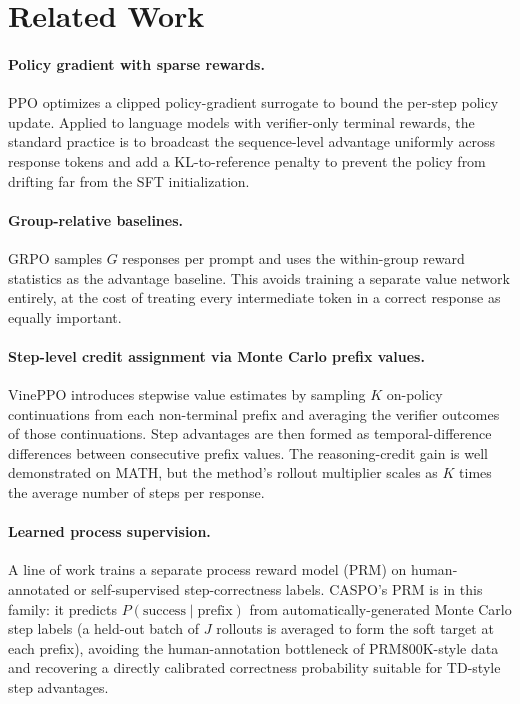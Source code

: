 \documentclass[11pt]{article}
\newcommand{\caspo}{\textsc{CASPO}}
\newcommand{\ppo}{PPO}
\newcommand{\grpo}{GRPO}
\newcommand{\vineppo}{VinePPO}
\begin{document}
\section{Related Work}
\label{sec:related}

\paragraph{Policy gradient with sparse rewards.}
\ppo{} \citep{schulman2017ppo} optimizes a clipped policy-gradient surrogate
to bound the per-step policy update. Applied to language models with
verifier-only terminal rewards, the standard practice is to broadcast the
sequence-level advantage uniformly across response tokens and add a
KL-to-reference penalty to prevent the policy from drifting far from the SFT
initialization.

\paragraph{Group-relative baselines.}
\grpo{} \citep{deepseekmath2024} samples $G$ responses per prompt and uses
the within-group reward statistics as the advantage baseline. This avoids
training a separate value network entirely, at the cost of treating every
intermediate token in a correct response as equally important.

\paragraph{Step-level credit assignment via Monte Carlo prefix values.}
\vineppo{} \citep{vineppo2024} introduces stepwise value estimates by
sampling $K$ on-policy continuations from each non-terminal prefix and
averaging the verifier outcomes of those continuations. Step advantages are
then formed as temporal-difference differences between consecutive prefix
values. The reasoning-credit gain is well demonstrated on MATH, but the
method's rollout multiplier scales as $K$ times the average number of steps
per response.

\paragraph{Learned process supervision.}
A line of work trains a separate process reward model (PRM) on
human-annotated or self-supervised step-correctness labels. \caspo{}'s
PRM is in this family: it predicts $P(\text{success} \mid \text{prefix})$
from automatically-generated Monte Carlo step labels (a held-out batch
of $J$ rollouts is averaged to form the soft target at each prefix),
avoiding the human-annotation bottleneck of PRM800K-style data and
recovering a directly calibrated correctness probability suitable for
TD-style step advantages.
\end{document}
